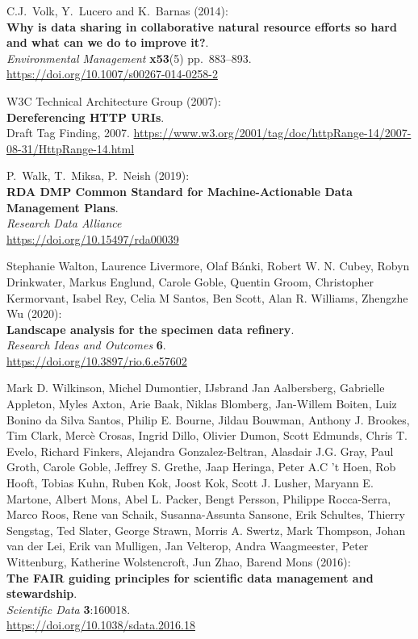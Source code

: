\begin{thebibliography}{9}
C.J.~Volk, Y.~Lucero and K.~Barnas (2014):\\
\textbf{Why is data sharing in collaborative natural resource efforts so
hard and what can we do to improve it?}.\\
\emph{Environmental Management} \textbf{x53}(5) pp.~883--893.\\
\url{https://doi.org/10.1007/s00267-014-0258-2}

W3C Technical Architecture Group (2007):\\
\textbf{Dereferencing HTTP URIs}.\\
Draft Tag Finding, 2007.
\url{https://www.w3.org/2001/tag/doc/httpRange-14/2007-08-31/HttpRange-14.html}

P.~Walk, T.~Miksa, P.~Neish (2019):\\
\textbf{RDA DMP Common Standard for Machine-Actionable Data Management
Plans}.\\
\emph{Research Data Alliance}\\
\url{https://doi.org/10.15497/rda00039}

Stephanie Walton, Laurence Livermore, Olaf Bánki, Robert W. N.
Cubey, Robyn Drinkwater, Markus Englund, Carole Goble, Quentin Groom,
Christopher Kermorvant, Isabel Rey, Celia M Santos, Ben Scott, Alan R.
Williams, Zhengzhe Wu (2020):\\
\textbf{Landscape analysis for the specimen data refinery}.\\
\emph{Research Ideas and Outcomes} \textbf{6}.\\
\url{https://doi.org/10.3897/rio.6.e57602}

Mark D. Wilkinson, Michel Dumontier, IJsbrand Jan Aalbersberg,
Gabrielle Appleton, Myles Axton, Arie Baak, Niklas Blomberg, Jan-Willem
Boiten, Luiz Bonino da Silva Santos, Philip E. Bourne, Jildau Bouwman,
Anthony J. Brookes, Tim Clark, Mercè Crosas, Ingrid Dillo, Olivier
Dumon, Scott Edmunds, Chris T. Evelo, Richard Finkers, Alejandra
Gonzalez-Beltran, Alasdair J.G. Gray, Paul Groth, Carole Goble, Jeffrey
S. Grethe, Jaap Heringa, Peter A.C 't Hoen, Rob Hooft, Tobias Kuhn,
Ruben Kok, Joost Kok, Scott J. Lusher, Maryann E. Martone, Albert Mons,
Abel L. Packer, Bengt Persson, Philippe Rocca-Serra, Marco Roos, Rene
van Schaik, Susanna-Assunta Sansone, Erik Schultes, Thierry Sengstag,
Ted Slater, George Strawn, Morris A. Swertz, Mark Thompson, Johan van
der Lei, Erik van Mulligen, Jan Velterop, Andra Waagmeester, Peter
Wittenburg, Katherine Wolstencroft, Jun Zhao, Barend Mons (2016):\\
\textbf{The FAIR guiding principles for scientific data management and
stewardship}.\\
\emph{Scientific Data} \textbf{3}:160018.\\
\url{https://doi.org/10.1038/sdata.2016.18}


\end{thebibliography}
